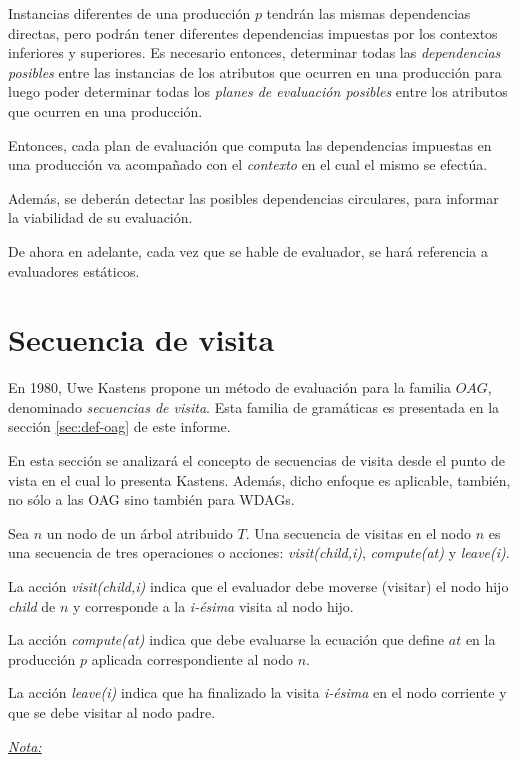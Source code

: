 Instancias diferentes de una producción $p$ tendrán las mismas dependencias directas, pero podrán tener diferentes dependencias impuestas por los contextos inferiores y superiores. Es necesario entonces, determinar todas las \emph{dependencias posibles} entre las instancias de los atributos que ocurren en una producción para luego poder determinar todas los \emph{planes de evaluación posibles} entre los atributos que ocurren en una producción.

Entonces, cada plan de evaluación que computa las dependencias impuestas en una producción va acompañado con el \textit{contexto} en el cual el mismo se efectúa.

Además, se deberán detectar las posibles dependencias circulares, para informar la viabilidad de su evaluación.

De ahora en adelante, cada vez que se hable de evaluador, se hará referencia a evaluadores estáticos.

\section{Secuencia de visita}
\label{sec:sec-visit}
En 1980, Uwe Kastens propone un método de evaluación para la familia $OAG$, denominado \emph{secuencias de visita}\cite{kastens}. Esta familia de gramáticas es presentada en la sección \ref{sec:def-oag} de este informe.

En esta sección se analizará el concepto de secuencias de visita desde el punto de vista en el cual lo presenta Kastens. Además, dicho enfoque es aplicable, también, no sólo a las OAG sino también para WDAGs.

Sea $n$ un nodo de un árbol atribuido $T$. 
Una secuencia de visitas en el nodo $n$ es una secuencia de tres operaciones o acciones: 
\emph{visit(child,i)}, \emph{compute(at)} y \emph{leave(i)}.

\begin{description}
\item La acción \emph{visit(child,i)} indica que el evaluador debe moverse (visitar) el nodo hijo \emph{child} de $n$ y corresponde a la \emph{i-ésima} visita al nodo hijo.

\item La acción \emph{compute(at)} indica que debe evaluarse la ecuación que define 
$at$ en la producción $p$ aplicada correspondiente al nodo $n$.

\item La acción \emph{leave(i)} indica que ha finalizado la visita \emph{i-ésima} en
el nodo corriente y que se debe visitar al nodo padre.
\end{description}
\underline{\textit{Nota:}}

